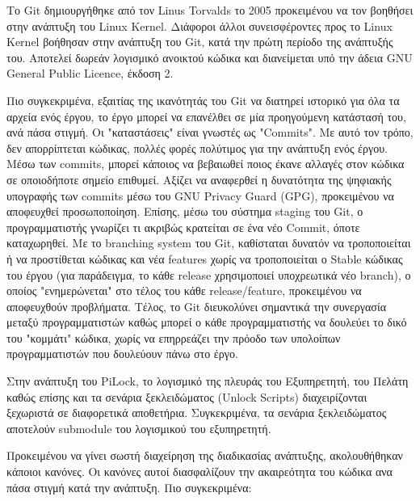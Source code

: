 	Το Git δημιουργήθηκε από τον Linus Torvalds το 2005 προκειμένου να τον βοηθήσει στην ανάπτυξη του Linux Kernel\textsuperscript{\cite{Git_History}}. Διάφοροι άλλοι συνεισφέροντες προς το Linux Kernel βοήθησαν στην ανάπτυξη του Git, κατά την πρώτη περίοδο της ανάπτυξής του. Αποτελεί δωρεάν λογισμικό ανοικτού κώδικα και διανείμεται υπό την άδεια GNU General Public Licence, έκδοση 2\textsuperscript{\cite{Git_Licence}}. 

	Πιο συγκεκριμένα, εξαιτίας της ικανότητάς του Git να διατηρεί ιστορικό για όλα τα αρχεία ενός έργου, το έργο μπορεί να επανέλθει σε μία προηγούμενη κατάστασή του, ανά πάσα στιγμή. Οι "καταστάσεις" είναι γνωστές ως "Commits". Με αυτό τον τρόπο, δεν απορρίπτεται κώδικας, πολλές φορές πολύτιμος για την ανάπτυξη ενός έργου. Μέσω των commits, μπορεί κάποιος να βεβαιωθεί ποιος έκανε αλλαγές στον κώδικα σε οποιοδήποτε σημείο επιθυμεί. Αξίζει να αναφερθεί η δυνατότητα της ψηφιακής υπογραφής των commits μέσω του GNU Privacy Guard (GPG), προκειμένου να αποφευχθεί προσωποποίηση\textsuperscript{\cite{Git_commit_assurance}}. Επίσης, μέσω του σύστημα staging του Git, ο προγραμματιστής γνωρίζει τι ακριβώς κρατείται σε ένα νέο Commit, όποτε καταχωρηθεί. Με το branching system του Git, καθίσταται δυνατόν να τροποποιείται ή να προστίθεται κώδικας και νέα features χωρίς να τροποποιείται ο Stable κώδικας του έργου (για παράδειγμα, το κάθε release χρησιμοποιεί υποχρεωτικά νέο branch), ο οποίος "ενημερώνεται" στο τέλος του κάθε release/feature, προκειμένου να αποφευχθούν προβλήματα. Τέλος, το Git διευκολύνει σημαντικά την συνεργασία μεταξύ προγραμματιστών καθώς μπορεί ο κάθε προγραμματιστής να δουλεύει το δικό του "κομμάτι" κώδικα, χωρίς να επηρρεάζει την πρόοδο των υπολοίπων προγραμματιστών που δουλεύουν πάνω στο έργο.

	Στην ανάπτυξη του PiLock, το λογισμικό της πλευράς του Εξυπηρετητή, του Πελάτη καθώς επίσης και τα σενάρια ξεκλειδώματος (Unlock Scripts) διαχειρίζονται ξεχωριστά σε διαφορετικά αποθετήρια. Συγκεκριμένα, τα σενάρια ξεκλειδώματος αποτελούν submodule του λογισμικού του εξυπηρετητή.

	Προκειμένου να γίνει σωστή διαχείρηση της διαδικασίας ανάπτυξης, ακολουθήθηκαν κάποιοι κανόνες. Οι κανόνες αυτοί διασφαλίζουν την ακαιρεότητα του κώδικα ανα πάσα στιγμή κατά την ανάπτυξη. Πιο συγκεκριμένα:

